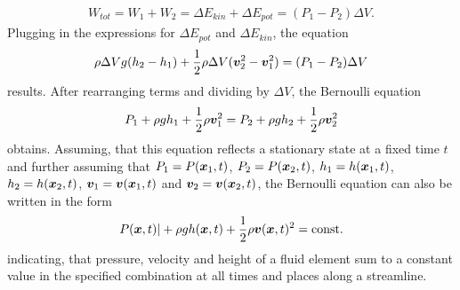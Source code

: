 \documentclass[a4paper,11pt]{report}
\begin{document}
\begin{gather}
W_{tot} = W_1 + W_2 = \Delta E_{kin} + \Delta E_{pot} = (P_1-P_2)\Delta V.
\end{gather} Plugging in the expressions for $\Delta E_{pot}$ and $\Delta E_{kin}$, the equation \begin{equation}
\rho \Delta V g (h_2-h_1) + \frac{1}{2}\rho \Delta V (\bm{v}_2^2 - \bm{v}_1^2) = (P_1-P_2)\Delta V
\end{equation} results. After rearranging terms and dividing by $\Delta V$, the Bernoulli equation \begin{equation}
P_1 + \rho g h_1 + \frac{1}{2}\rho \bm{v}_1^2 = P_2 + \rho g h_2 + \frac{1}{2}\rho \bm{v}_2^2
\end{equation} obtains. Assuming, that this equation reflects a stationary state at a fixed time $t$ and further assuming that $P_1 = P(\bm{x}_1,t)$, $P_2 = P(\bm{x}_2,t)$, $h_1 = h(\bm{x}_1,t)$, $h_2 = h(\bm{x}_2,t)$, $\bm{v}_1 = \bm{v}(\bm{x}_1,t)$ and $\bm{v}_2 = \bm{v}(\bm{x}_2,t)$, the Bernoulli equation can also be written in the form \begin{equation}
P(\bm{x},t)| + \rho g h(\bm{x},t)+ \frac{1}{2}\rho \bm{v}(\bm{x},t)^2 = \text{const.}
\end{equation} indicating, that pressure, velocity and height of a fluid element sum to a constant value in the specified combination at all times and places along a streamline.
\end{document}
